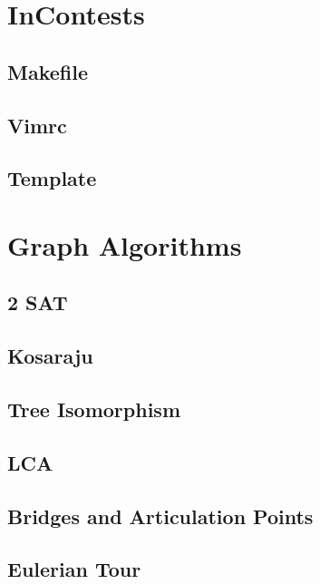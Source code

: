 \section{InContests}
\subsection{Makefile}
\raggedbottom
\hrulefill
\subsection{Vimrc}
\raggedbottom
\hrulefill
\subsection{Template}
\raggedbottom
\hrulefill

\section{Graph Algorithms}
\subsection{2 SAT}
\raggedbottom
\hrulefill
\subsection{Kosaraju}
\raggedbottom
\hrulefill
\subsection{Tree Isomorphism}
\raggedbottom
\hrulefill
\subsection{LCA}
\raggedbottom
\hrulefill
\subsection{Bridges and Articulation Points}
\raggedbottom
\hrulefill
\subsection{Eulerian Tour}
\raggedbottom
\hrulefill

